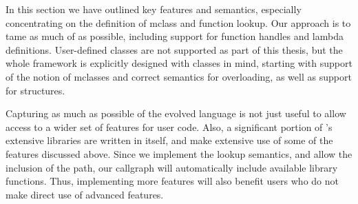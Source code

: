 In this section we have outlined key \matlab features and semantics,
especially concentrating on the definition of mclass and function
lookup.  Our approach is to tame as much of \matlab as possible,
including support for function handles and lambda
definitions. User-defined classes are not supported as part of this
thesis, but the whole framework is explicitly designed with classes in
mind, starting with support of the notion of mclasses and correct
semantics for overloading, as well as support for structures.

Capturing as much as possible of the evolved language is not just
useful to allow access to a wider set of \matlab features for user
code.  Also, a significant portion of \matlab's extensive libraries
are written in \matlab itself, and make extensive use of some of the
features discussed above. Since we implement the \matlab lookup
semantics, and allow the inclusion of the \matlab path, our callgraph
will automatically include available \matlab library functions. Thus,
implementing more features will also benefit users who do not make
direct use of advanced features.
